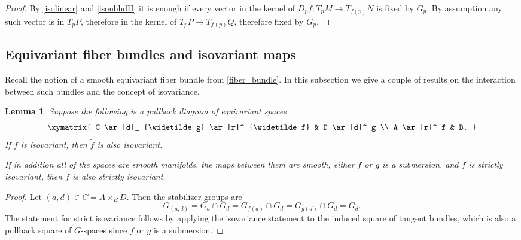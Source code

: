 \documentclass[11pt]{amsart}
\newtheorem{lem}{Lemma}[section]
\theoremstyle{definition}
\numberwithin{equation}{section}
\numberwithin{figure}{section}
\newcommand{\ti}{\widetilde}
\newcommand{\Sta}{\textup{Stab}}
\begin{document}
\begin{proof}
By \autoref{isolinear} and \autoref{isonbhdH} it is enough if every vector in the kernel of $D_pf\colon T_pM\to T_{f(p)}N$ is fixed by $G_p$. By assumption any such vector is in $T_pP$, therefore in the kernel of $T_pP\to T_{f(p)}Q$, therefore fixed by $G_p$.
\end{proof}


\subsection{Equivariant fiber bundles and isovariant maps}\label{fiberbundles1}

Recall the notion of a smooth equivariant fiber bundle from \autoref{fiber_bundle}. In this subsection we give a couple of results on the interaction between such bundles and the concept of isovariance.

\begin{lem}\label{pullbackiso}
Suppose the following is a pullback diagram of equivariant spaces 
\[ \xymatrix{
	C \ar[d]_-{\ti g} \ar[r]^-{\ti f} & D \ar[d]^-g \\
	A \ar[r]^-f & B.
} \]
If $f$ is isovariant, then $\ti f$ is also isovariant.

If in addition all of the spaces are smooth manifolds, the maps between them are smooth, either $f$ or $g$ is a submersion, and $f$ is strictly isovariant, then $\ti f$ is also strictly isovariant.
\end{lem}

\begin{proof}
Let $(a,d)\in C=A\times_B D$. Then the stabilizer groups are
\[ G_{(a,d)}=G_a\cap G_d=G_{f(a)}\cap G_d=G_{g(d)}\cap G_d=G_d . \]
The statement for strict isovariance follows by applying the isovariance statement to the induced square of tangent bundles, which is also a pullback square of $G$-spaces since $f$ or $g$ is a submersion.
\end{proof}
\end{document}

